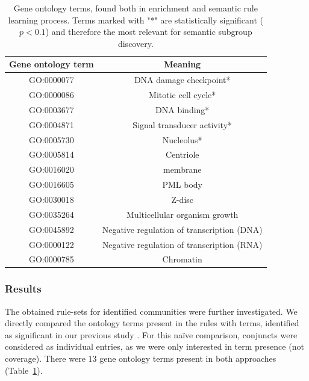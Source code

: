 \documentclass[oribibl,runningheads,a4paper]{llncs}
\begin{document}
\begin{table}[!t]
\centering
\caption{Gene ontology terms, found  both in enrichment and semantic rule learning process. Terms marked with "*" are statistically significant ($p < 0.1$) and therefore the most relevant for semantic subgroup discovery.}

\label{table:results}
\begin{tabular}{|c c|}
\hline
Gene ontology term & Meaning                              \\ \hline 
GO:0000077         & DNA damage checkpoint*                \\ 
GO:0000086         & Mitotic cell cycle*                   \\ 
GO:0003677         & DNA binding*                          \\ 
GO:0004871         & Signal transducer activity*           \\ 
GO:0005730         & Nucleolus*                            \\ 
GO:0005814         & Centriole                            \\ 
GO:0016020         & membrane                             \\ 
GO:0016605         & PML body                             \\ 
GO:0030018         & Z-disc                               \\ 
GO:0035264         & Multicellular organism growth        \\ 
GO:0045892         & Negative regulation of transcription (DNA) \\ 
GO:0000122         & Negative regulation of transcription (RNA) \\ 
GO:0000785         & Chromatin                            \\ \hline
\end{tabular}
\end{table}


\subsubsection{Results}

The obtained rule-sets for identified communities were further investigated. We directly compared the ontology terms present in the rules with terms, identified as significant in our previous study \cite{skrlj2017}. For this na\"ive comparison, conjuncts were considered as individual entries, as we were only interested in term presence (not coverage). There were $13$ gene ontology terms present in both approaches (Table~\ref{table:results}).
\end{document}
